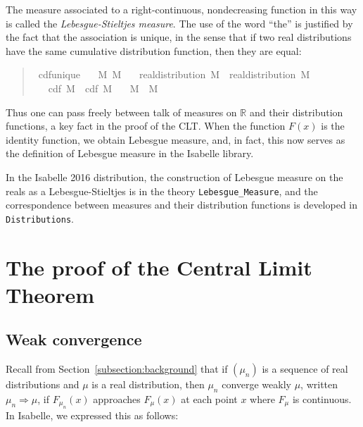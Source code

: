 \documentclass{svjour3}
\newcommand{\RR}{\mathbb{R}}
\begin{document}
The measure associated to a right-continuous, nondecreasing function in this way is called the \emph{Lebesgue-Stieltjes measure}. The use of the word ``the'' is justified by the fact that the association is unique, in the sense that if two real distributions have the same cumulative distribution function, then they are equal: 
\begin{quote}
\begin{isabellebody}
\isamarkupfalse%
\ cdf{\isacharunderscore}unique{\isacharcolon}\isanewline
\ \ \ M{}\ M{}\isanewline
\ \ \ {\isachardoublequoteopen}real{\isacharunderscore}distribution\ M{}{\isachardoublequoteclose}\ \ {\isachardoublequoteopen}real{\isacharunderscore}distribution\ M{}{\isachardoublequoteclose}\isanewline
\ \ \ {\isachardoublequoteopen}cdf\ M{}\ {\isacharequal}\ cdf\ M{}{\isachardoublequoteclose}\isanewline
\ \ \ {\isachardoublequoteopen}M{}\ {\isacharequal}\ M{}{\isachardoublequoteclose}
\end{isabellebody}
\end{quote}
Thus one can pass freely between talk of measures on $\RR$ and their distribution functions, a key fact in the proof of the CLT. When the function $F(x)$ is the identity function, we obtain Lebesgue measure, and, in fact, this now serves as the definition of Lebesgue measure in the Isabelle library.

In the Isabelle 2016 distribution, the construction of Lebesgue measure on the reals as a Lebesgue-Stieltjes is in the theory \verb=Lebesgue_Measure=, and the correspondence between measures and their distribution functions is developed in \verb=Distributions=.

\section{The proof of the Central Limit Theorem}
\label{section:formal}

\subsection{Weak convergence}
\label{subsection:weak:convergence}

Recall from Section~\ref{subsection:background} that if $(\mu_n)$ is a sequence of real distributions and $\mu$ is a real distribution, then $\mu_n$ converge weakly $\mu$, written $\mu_n \Rightarrow \mu$, if $F_{\mu_n}(x)$ approaches $F_\mu(x)$ at each point $x$ where $F_\mu$ is continuous. In Isabelle, we expressed this as follows:
\end{document}
